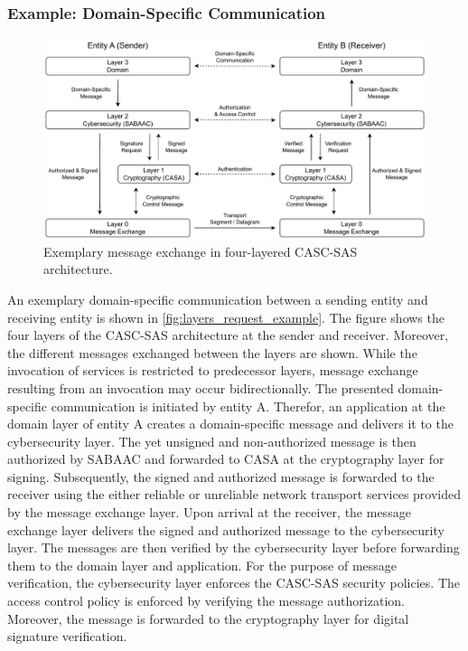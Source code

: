 \subsubsection{Example: Domain-Specific Communication}
\begin{figure}
    \centering
    \includegraphics[width=1.0\linewidth]{figures/layers_request_example.drawio.pdf}
    \caption{Exemplary message exchange in four-layered CASC-SAS architecture.}
    \label{fig:layers_request_example}
\end{figure}
An exemplary domain-specific communication between a sending entity and receiving entity is shown in \autoref{fig:layers_request_example}.
The figure shows the four layers of the CASC-SAS architecture at the sender and receiver.
Moreover, the different messages exchanged between the layers are shown.
While the invocation of services is restricted to predecessor layers, message exchange resulting from an invocation may occur bidirectionally.
The presented domain-specific communication is initiated by entity A.
Therefor, an application at the domain layer of entity A creates a domain-specific message and delivers it to the cybersecurity layer.
The yet unsigned and non-authorized message is then authorized by SABAAC and forwarded to CASA at the cryptography layer for signing.
Subsequently, the signed and authorized message is forwarded to the receiver using the either reliable or unreliable network transport services provided by the message exchange layer.
Upon arrival at the receiver, the message exchange layer delivers the signed and authorized message to the cybersecurity layer.
The messages are then verified by the cybersecurity layer before forwarding them to the domain layer and application.
For the purpose of message verification, the cybersecurity layer enforces the CASC-SAS security policies.
The access control policy is enforced by verifying the message authorization.
Moreover, the message is forwarded to the cryptography layer for digital signature verification.


